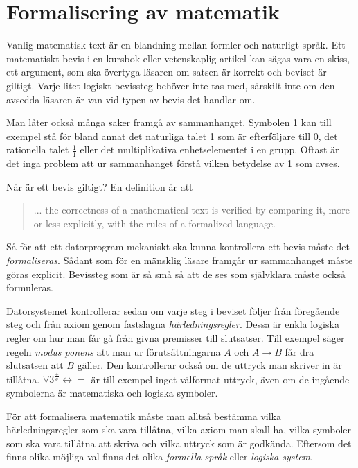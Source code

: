 \section{Formalisering av matematik}
Vanlig matematisk text är en blandning mellan formler och naturligt språk. Ett
matematiskt bevis i en kursbok eller vetenskaplig artikel kan sägas vara en
skiss, ett argument, som ska övertyga läsaren om satsen är korrekt och beviset
är giltigt. Varje litet logiskt bevissteg behöver inte tas med, särskilt inte
om den avsedda läsaren är van vid typen av bevis det handlar om.

Man låter också många saker framgå av sammanhanget. Symbolen 1 kan till exempel
stå för bland annat det naturliga talet 1 som är efterföljare till 0, det
rationella talet $\frac{1}{1}$ eller det multiplikativa enhetselementet i en
grupp. Oftast är det inga problem att ur sammanhanget förstå vilken betydelse
av 1 som avses.

När är ett bevis giltigt? En definition är att
\begin{quote}
... the correctness of a mathematical text is verified by comparing it, more or
less explicitly, with the rules of a formalized language\cite{bourbaki}.
\end{quote}

Så för att ett datorprogram mekaniskt ska kunna kontrollera ett bevis måste det
\emph{formaliseras}. Sådant som för en mänsklig läsare framgår ur sammanhanget
måste göras explicit. Bevissteg som är så små så att de ses som självklara
måste också formuleras.

Datorsystemet kontrollerar sedan om varje steg i beviset följer från föregående
steg och från axiom genom fastslagna \emph{härledningsregler}. Dessa är enkla
logiska regler om hur man får gå från givna premisser till slutsatser. Till
exempel säger regeln \emph{modus ponens} att man ur förutsättningarna $A$ och
$A \to B$ får dra slutsatsen att $B$ gäller. Den kontrollerar också om de
uttryck man skriver in är tillåtna.
$\forall 3^{\frac{+}{\in}} \leftrightarrow =$ är till exempel inget välformat
uttryck, även om de ingående symbolerna är matematiska och logiska symboler.

För att formalisera matematik måste man alltså bestämma vilka härledningsregler
som ska vara tillåtna, vilka axiom man skall ha, vilka symboler som ska vara
tillåtna att skriva och vilka uttryck som är godkända. Eftersom det finns olika
möjliga val finns det olika \emph{formella språk} eller \emph{logiska system}.

